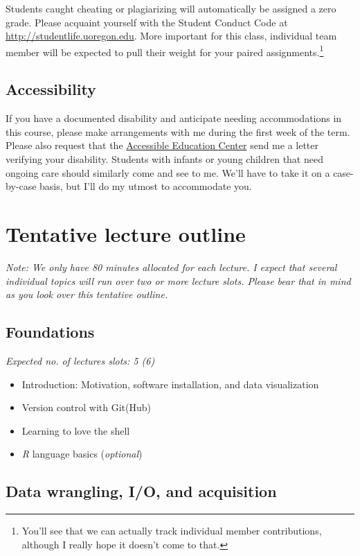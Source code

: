 \documentclass[12]{article}
\begin{document}
Students caught cheating or plagiarizing will automatically be assigned a zero
grade. Please acquaint yourself with the Student Conduct Code at
\url{http://studentlife.uoregon.edu}. More important for this class, individual 
team member will be expected to pull their weight for your paired
assignments.\footnote{You'll see that we can actually track individual member
contributions, although I really hope it doesn't come to that.}

\subsection*{Accessibility}

If you have a documented disability and anticipate needing accommodations in
this course, please make arrangements with me during the first week of the term.
Please also request that the \href{https://aec.uoregon.edu/}{Accessible
Education Center} send me a letter verifying your disability. Students with
infants or young children that need ongoing care should similarly come and see
to me. We'll have to take it on a case-by-case basis, but I'll do my utmost to
accommodate you.

\newpage
\section*{Tentative lecture outline}
\label{sec:outline}

\textit{Note: We only have 80 minutes allocated for each lecture. I expect that
several individual topics will run over two or more lecture slots. Please bear
that in mind as you look over this tentative outline.}

\subsection*{Foundations}

\textit{Expected no. of lectures slots: 5 (6)}

\begin{itemize}
	\item Introduction: Motivation, software installation, and data visualization
	\item Version control with Git(Hub)
	\item Learning to love the shell
	\item \textit{R} language basics (\textit{optional})
\end{itemize}

\subsection*{Data wrangling, I/O, and acquisition}
\end{document}

